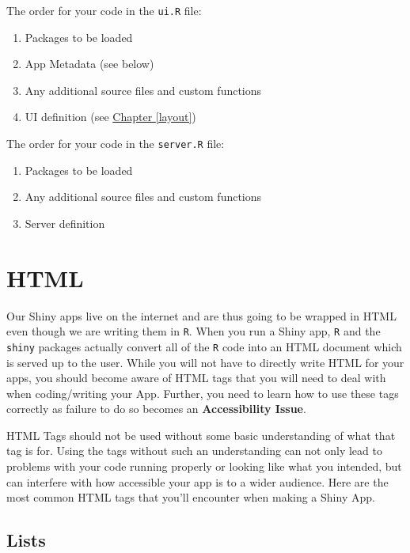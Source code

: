 \documentclass[
]{book}
\providecommand{\tightlist}{%
  \setlength{\itemsep}{0pt}\setlength{\parskip}{0pt}}
\begin{document}
The order for your code in the \texttt{ui.R} file:

\begin{enumerate}
\def\labelenumi{\arabic{enumi}.}
\tightlist
\item
  Packages to be loaded
\item
  App Metadata (see below)
\item
  Any additional source files and custom functions
\item
  UI definition (see \protect\hyperlink{layout}{Chapter \ref{layout}})
\end{enumerate}

The order for your code in the \texttt{server.R} file:

\begin{enumerate}
\def\labelenumi{\arabic{enumi}.}
\tightlist
\item
  Packages to be loaded
\item
  Any additional source files and custom functions
\item
  Server definition
\end{enumerate}

\hypertarget{html}{%
\section{HTML}\label{html}}

Our Shiny apps live on the internet and are thus going to be wrapped in HTML even though we are writing them in \texttt{R}. When you run a Shiny app, \texttt{R} and the \texttt{shiny} packages actually convert all of the \texttt{R} code into an HTML document which is served up to the user. While you will not have to directly write HTML for your apps, you should become aware of HTML tags that you will need to deal with when coding/writing your App. Further, you need to learn how to use these tags correctly as failure to do so becomes an \textbf{Accessibility Issue}.

HTML Tags should not be used without some basic understanding of what that tag is for. Using the tags without such an understanding can not only lead to problems with your code running properly or looking like what you intended, but can interfere with how accessible your app is to a wider audience. Here are the most common HTML tags that you'll encounter when making a Shiny App.

\hypertarget{lists}{%
\subsection{Lists}\label{lists}}
\end{document}
